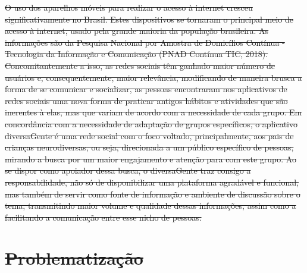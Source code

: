 \documentclass[
    12pt,               %
    openright,          %
    oneside,
    a4paper,            %
    paginasA3,  %
    BIBLATEX,           %
    REFINDENT,          %
    MODELO,             %
    TODO,               %
    english,            %
    brazil              %
    ]{ifsp-spo-inf-ctds} %
\providecommand{\DIFdel}[1]{{\protect\color{red}\sout{#1}}}                      %
\begin{document}
\DIFdel{O uso dos aparelhos móveis para realizar o acesso à internet cresceu significativamente no Brasil. Estes dispositivos se tornaram o principal meio de acesso à internet, usado pela grande maioria da população brasileira. As informações são da Pesquisa Nacional por Amostra de Domicílios Contínua - Tecnologia da Informação e Comunicação (PNAD Contínua TIC, 2018). Concomitantemente a isso, as redes sociais têm ganhado maior número de usuários e, consequentemente, maior relevância, modificando de maneira brusca a forma de se comunicar e socializar, as pessoas encontraram nos aplicativos de redes sociais uma nova forma de praticar antigos hábitos e atividades que são inerentes à elas, mas que variam de acordo com a necessidade de cada grupo. Em concordância com a necessidade de adaptação de grupos específicos, o aplicativo diversaGente é uma rede social com o foco voltado, principalmente, aos pais de crianças neurodiversas, ou seja, direcionada a um público específico de pessoas, mirando a busca por um maior engajamento e atenção para com este grupo. Ao se dispor como apoiador dessa busca, o diversaGente traz consigo a responsabilidade, não só de disponibilizar uma plataforma agradável e funcional, mas também de servir como fonte de informação e ambiente de discussão sobre o tema,  transmitindo maior volume e qualidade dessas informações, assim como a facilitando a comunicação entre esse nicho de pessoas.
}%

\section{\DIFdel{Problematização}}
\addtocounter{section}{-1}%
\end{document}

